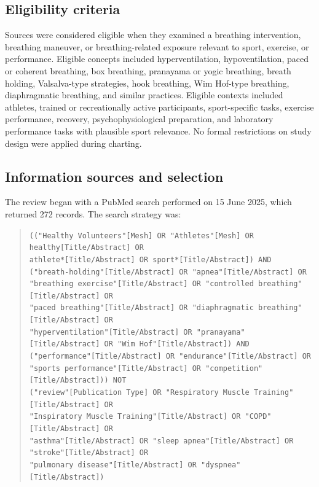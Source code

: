 \documentclass[11pt,a4paper]{article}
\begin{document}
\subsection{Eligibility criteria}
Sources were considered eligible when they examined a breathing intervention, breathing maneuver, or breathing-related exposure relevant to sport, exercise, or performance. Eligible concepts included hyperventilation, hypoventilation, paced or coherent breathing, box breathing, pranayama or yogic breathing, breath holding, Valsalva-type strategies, hook breathing, Wim Hof-type breathing, diaphragmatic breathing, and similar practices. Eligible contexts included athletes, trained or recreationally active participants, sport-specific tasks, exercise performance, recovery, psychophysiological preparation, and laboratory performance tasks with plausible sport relevance. No formal restrictions on study design were applied during charting.

\subsection{Information sources and selection}
The review began with a PubMed search performed on 15 June 2025, which returned 272 records. The search strategy was:

\begin{quote}
\scriptsize
\raggedright
\texttt{(("Healthy Volunteers"[Mesh] OR "Athletes"[Mesh] OR healthy[Title/Abstract] OR}\\
\texttt{athlete*[Title/Abstract] OR sport*[Title/Abstract]) AND}\\
\texttt{("breath-holding"[Title/Abstract] OR "apnea"[Title/Abstract] OR}\\
\texttt{"breathing exercise"[Title/Abstract] OR "controlled breathing"[Title/Abstract] OR}\\
\texttt{"paced breathing"[Title/Abstract] OR "diaphragmatic breathing"[Title/Abstract] OR}\\
\texttt{"hyperventilation"[Title/Abstract] OR "pranayama"[Title/Abstract] OR "Wim Hof"[Title/Abstract]) AND}\\
\texttt{("performance"[Title/Abstract] OR "endurance"[Title/Abstract] OR}\\
\texttt{"sports performance"[Title/Abstract] OR "competition"[Title/Abstract])) NOT}\\
\texttt{("review"[Publication Type] OR "Respiratory Muscle Training"[Title/Abstract] OR}\\
\texttt{"Inspiratory Muscle Training"[Title/Abstract] OR "COPD"[Title/Abstract] OR}\\
\texttt{"asthma"[Title/Abstract] OR "sleep apnea"[Title/Abstract] OR "stroke"[Title/Abstract] OR}\\
\texttt{"pulmonary disease"[Title/Abstract] OR "dyspnea"[Title/Abstract])}
\end{quote}
\end{document}
